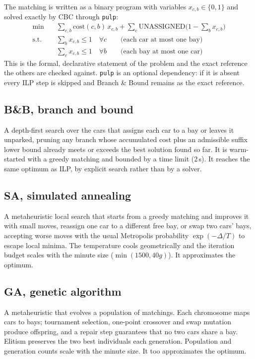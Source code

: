 \documentclass[11pt,a4paper]{article}
\newcommand{\code}[1]{\texttt{\small #1}}
\begin{document}
The matching is written as a binary program with variables $x_{c,b}\in\{0,1\}$ and solved
exactly by CBC through \code{pulp}:
\begin{align}
\min \quad & \sum_{c,b} \mathrm{cost}(c,b)\,x_{c,b}
           + \sum_{c}\mathrm{UNASSIGNED}\Big(1-\sum_{b}x_{c,b}\Big) \\
\text{s.t.}\quad & \sum_{b} x_{c,b} \le 1 \quad \forall c
           \qquad\text{(each car at most one bay)}\\
           & \sum_{c} x_{c,b} \le 1 \quad \forall b
           \qquad\text{(each bay at most one car)}
\end{align}
This is the formal, declarative statement of the problem and the exact reference the
others are checked against. \code{pulp} is an optional dependency: if it is absent every
ILP step is skipped and Branch \& Bound remains as the exact reference.

\subsection{B\&B, branch and bound}

A depth-first search over the cars that assigns each car to a bay or leaves it unparked,
pruning any branch whose accumulated cost plus an admissible suffix lower bound already
meets or exceeds the best solution found so far. It is warm-started with a greedy
matching and bounded by a time limit (2\,s). It reaches the same optimum as ILP, by
explicit search rather than by a solver.

\subsection{SA, simulated annealing}

A metaheuristic local search that starts from a greedy matching and improves it with
small moves, reassign one car to a different free bay, or swap two cars' bays, accepting worse moves with the usual Metropolis probability $\exp(-\Delta/T)$ to escape
local minima. The temperature cools geometrically and the iteration budget scales with
the minute size ($\min(1500, 40g)$). It approximates the optimum.

\subsection{GA, genetic algorithm}

A metaheuristic that evolves a population of matchings. Each chromosome maps cars to
bays; tournament selection, one-point crossover and swap mutation produce offspring, and
a repair step guarantees that no two cars share a bay. Elitism preserves the two best
individuals each generation. Population and generation counts scale with the minute size.
It too approximates the optimum.
\end{document}

